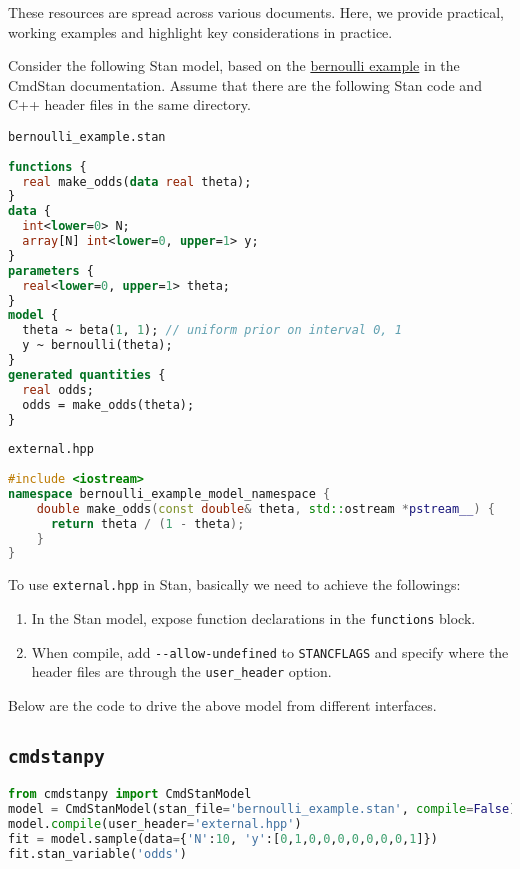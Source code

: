 \documentclass[11pt]{article}
\begin{document}
These resources are spread across various documents. Here, we provide practical, working examples and highlight key considerations in practice.

Consider the following Stan model, based on the \href{https://mc-stan.org/docs/cmdstan-guide/using-external-cpp-code.html}{bernoulli example} in the CmdStan documentation. Assume that there are the following Stan code and C++ header files in the same directory.

\verb|bernoulli_example.stan|
\begin{lstlisting}[language=Stan, style=lgeneral]
functions {
  real make_odds(data real theta);
}
data {
  int<lower=0> N;
  array[N] int<lower=0, upper=1> y;
}
parameters {
  real<lower=0, upper=1> theta;
}
model {
  theta ~ beta(1, 1); // uniform prior on interval 0, 1
  y ~ bernoulli(theta);
}
generated quantities {
  real odds;
  odds = make_odds(theta);
}
\end{lstlisting}

\verb|external.hpp|
\begin{lstlisting}[language=c++, style=lgeneral]
#include <iostream>
namespace bernoulli_example_model_namespace {
	double make_odds(const double& theta, std::ostream *pstream__) {
	  return theta / (1 - theta);
	}
}
\end{lstlisting}


To use \verb|external.hpp| in Stan, basically we need to achieve the followings:

\begin{enumerate}
	\item In the Stan model, expose function declarations in the \verb|functions| block.
	\item When compile, add \verb|--allow-undefined| to \verb|STANCFLAGS| and specify where the header files are through the \verb|user_header| option.
\end{enumerate}

Below are the code to drive the above model from different interfaces.


\cprotect\subsection{\verb|cmdstanpy|}
\begin{lstlisting}[language=py, style=lgeneral]
from cmdstanpy import CmdStanModel
model = CmdStanModel(stan_file='bernoulli_example.stan', compile=False)
model.compile(user_header='external.hpp')
fit = model.sample(data={'N':10, 'y':[0,1,0,0,0,0,0,0,0,1]})
fit.stan_variable('odds')
\end{lstlisting}
\end{document}
